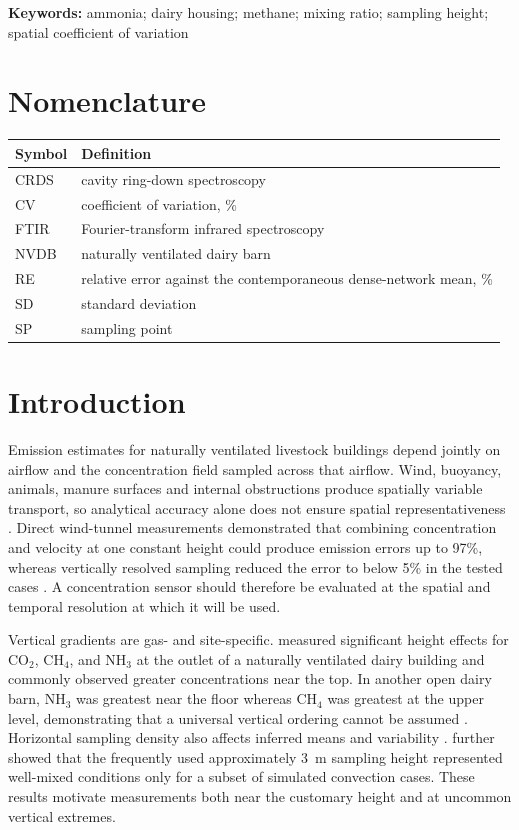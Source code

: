 ﻿\documentclass[12pt,a4paper]{article}
\begin{document}
\noindent\textbf{Keywords:} ammonia; dairy housing; methane; mixing ratio; sampling height; spatial coefficient of variation

\section*{Nomenclature}
\begin{tabular}{>{\raggedright\arraybackslash}p{2.2cm}>{\raggedright\arraybackslash}p{10.8cm}}
\toprule Symbol & Definition\\ \midrule
CRDS & cavity ring-down spectroscopy\\
CV & coefficient of variation, \%\\
FTIR & Fourier-transform infrared spectroscopy\\
NVDB & naturally ventilated dairy barn\\
RE & relative error against the contemporaneous dense-network mean, \%\\
SD & standard deviation\\
SP & sampling point\\ \bottomrule
\end{tabular}

\section{Introduction}
Emission estimates for naturally ventilated livestock buildings depend jointly on airflow and the concentration field sampled across that airflow. Wind, buoyancy, animals, manure surfaces and internal obstructions produce spatially variable transport, so analytical accuracy alone does not ensure spatial representativeness \citep{Calvet2013,Ogink2013}. Direct wind-tunnel measurements demonstrated that combining concentration and velocity at one constant height could produce emission errors up to 97\%, whereas vertically resolved sampling reduced the error to below 5\% in the tested cases \citep{Janke2020}. A concentration sensor should therefore be evaluated at the spatial and temporal resolution at which it will be used.

Vertical gradients are gas- and site-specific. \citet{Sahu2023} measured significant height effects for \(\mathrm{CO_2}\), \(\mathrm{CH_4}\), and \(\mathrm{NH_3}\) at the outlet of a naturally ventilated dairy building and commonly observed greater concentrations near the top. In another open dairy barn, \(\mathrm{NH_3}\) was greatest near the floor whereas \(\mathrm{CH_4}\) was greatest at the upper level, demonstrating that a universal vertical ordering cannot be assumed \citep{Durso2024}. Horizontal sampling density also affects inferred means and variability \citep{Durso2022,DeVogeleer2017}. \citet{Doumbia2021} further showed that the frequently used approximately \SI{3}{m} sampling height represented well-mixed conditions only for a subset of simulated convection cases. These results motivate measurements both near the customary height and at uncommon vertical extremes.
\end{document}

